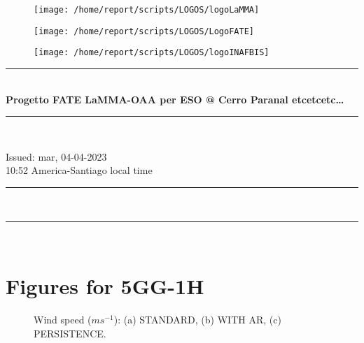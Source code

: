 \documentclass[11pt,english]{article}
\newcommand{\HRule}{\rule{\linewidth}{0.5mm}}
\begin{document}
\begin{figure}
\begin{center}
\hspace{1.5cm}
\parbox{5.5cm}{\texttt{[image: /home/report/scripts/LOGOS/logoLaMMA]}}
\hspace{.3cm}
\parbox{5.5cm}{\texttt{[image: /home/report/scripts/LOGOS/LogoFATE]}}
\hspace{.3cm}
\parbox{5.5cm}{\texttt{[image: /home/report/scripts/LOGOS/logoINAFBIS]}}
\hspace{.1cm}
\vspace{1.2cm}
\end{center}
\end{figure}

\begin{center}
\HRule \\[0.4cm]
\Huge{\textbf{Progetto FATE LaMMA-OAA per ESO @ Cerro Paranal etcetcetc\ldots}}
\HRule \\[0.4cm]
\end{center}

\begin{center}
\vspace{2cm}\Huge{Issued: mar, 04-04-2023\\ 10:52 America-Santiago local time}
\end{center}

\begin{center}
\HRule \\[0.1cm]
\tableofcontents
\HRule \\[0.1cm]
\end{center}
\newpage
\clearpage
\section{Figures for 5GG-1H}

\clearpage
\begin{figure}
\begin{minipage}{.5\linewidth}
\centering
{}
\end{minipage}%
\begin{minipage}{.5\linewidth}
\centering
{}
\end{minipage}\par\medskip
\centering
{}
\caption{Wind speed ($m s^{-1}$): (a) STANDARD, (b) WITH AR, (c) PERSISTENCE.}
\label{fig:ws}
\end{figure}
\end{document}
